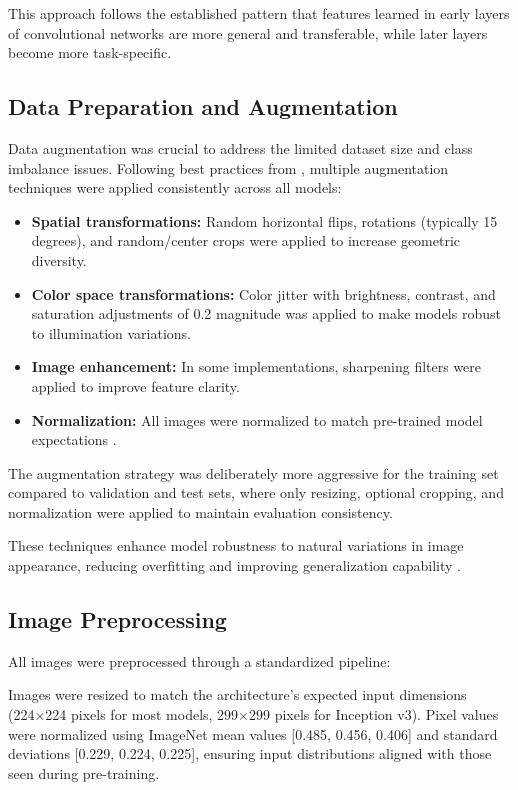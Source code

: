 \documentclass[a4paper,12pt]{report}
\begin{document}
This approach follows the established pattern that features learned in early layers of convolutional networks are more general and transferable, while later layers become more task-specific.

\subsection{Data Preparation and Augmentation}

Data augmentation was crucial to address the limited dataset size and class imbalance issues. Following best practices from \citep{perez2017effectivenessdataaugmentationimage}, multiple augmentation techniques were applied consistently across all models:

\begin{itemize}
    \item \textbf{Spatial transformations:} Random horizontal flips, rotations (typically 15 degrees), and random/center crops were applied to increase geometric diversity.
    \item \textbf{Color space transformations:} Color jitter with brightness, contrast, and saturation adjustments of 0.2 magnitude was applied to make models robust to illumination variations.
    \item \textbf{Image enhancement:} In some implementations, sharpening filters were applied to improve feature clarity.
    \item \textbf{Normalization:} All images were normalized to match pre-trained model expectations \citep{wu2018groupnormalization}.
\end{itemize}

The augmentation strategy was deliberately more aggressive for the training set compared to validation and test sets, where only resizing, optional cropping, and normalization were applied to maintain evaluation consistency.

These techniques enhance model robustness to natural variations in image appearance, reducing overfitting and improving generalization capability \citep{perez2017effectivenessdataaugmentationimage}.

\subsection{Image Preprocessing}

All images were preprocessed through a standardized pipeline:

Images were resized to match the architecture's expected input dimensions (224×224 pixels for most models, 299×299 pixels for Inception v3). Pixel values were normalized using ImageNet mean values [0.485, 0.456, 0.406] and standard deviations [0.229, 0.224, 0.225], ensuring input distributions aligned with those seen during pre-training.
\end{document}
